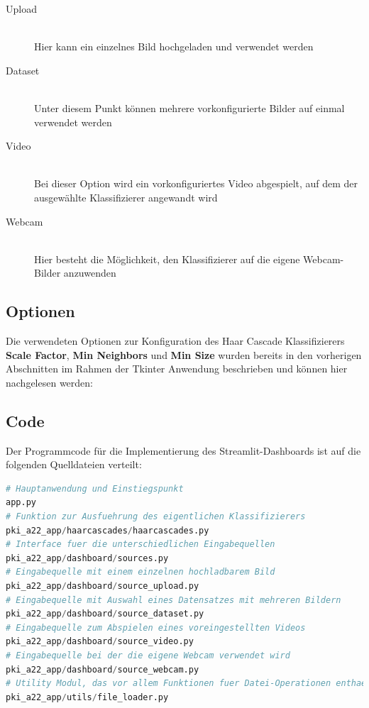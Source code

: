 \begin{description}
	\item[Upload]\hfill \\
	Hier kann ein einzelnes Bild hochgeladen und verwendet werden
	\item[Dataset]\hfill \\
	Unter diesem Punkt können mehrere vorkonfigurierte Bilder auf einmal verwendet werden
	\item[Video]\hfill \\
	Bei dieser Option wird ein vorkonfiguriertes Video abgespielt, auf dem der ausgewählte 
	Klassifizierer angewandt wird
	\item[Webcam]\hfill \\
	Hier besteht die Möglichkeit, den Klassifizierer auf die eigene Webcam-Bilder anzuwenden
\end{description}

\subsection{Optionen}
Die verwendeten Optionen zur Konfiguration des Haar Cascade Klassifizierers \textbf{Scale Factor},
\textbf{Min Neighbors} und \textbf{Min Size} wurden bereits in den vorherigen Abschnitten im Rahmen der
Tkinter Anwendung beschrieben und können hier nachgelesen werden: \cite{hackaday}

\subsection{Code}
Der Programmcode für die Implementierung des Streamlit-Dashboards ist auf die folgenden Quelldateien verteilt:

\begin{lstlisting}[language=Python]
# Hauptanwendung und Einstiegspunkt
app.py
# Funktion zur Ausfuehrung des eigentlichen Klassifizierers
pki_a22_app/haarcascades/haarcascades.py
# Interface fuer die unterschiedlichen Eingabequellen
pki_a22_app/dashboard/sources.py
# Eingabequelle mit einem einzelnen hochladbarem Bild
pki_a22_app/dashboard/source_upload.py
# Eingabequelle mit Auswahl eines Datensatzes mit mehreren Bildern
pki_a22_app/dashboard/source_dataset.py
# Eingabequelle zum Abspielen eines voreingestellten Videos
pki_a22_app/dashboard/source_video.py
# Eingabequelle bei der die eigene Webcam verwendet wird
pki_a22_app/dashboard/source_webcam.py
# Utility Modul, das vor allem Funktionen fuer Datei-Operationen enthaelt
pki_a22_app/utils/file_loader.py
\end{lstlisting}
\bigbreak


